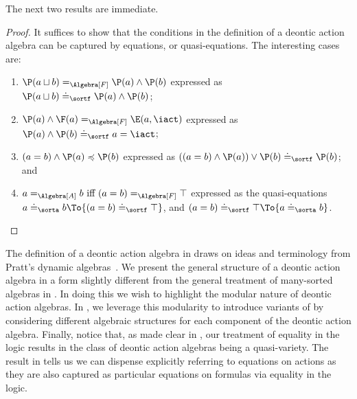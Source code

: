 \medskip

The next two results are immediate.

\medskip
{}
\medskip

\begin{proof}
	It suffices to show that the conditions in the definition of a deontic action algebra can be captured by equations, or quasi-equations.
	The interesting cases are:
	\smallskip
	\begin{enumerate}[leftmargin=\parindent]
		\item $\P(a \sqcup b) =_{\Algebra[F]} {\P(a) \land \P(b)}$ expressed as $\P(a \sqcup b) \doteq_{\sortf} \P(a) \land \P(b)$;
		\item ${\P(a) \land \F(a)} =_{\Algebra[F]} \E(a,\iact)$ expressed as ${\P(a) \land \P(b)} \doteq_{\sortf} {a = \iact}$;
		\item $(a = b) \land \P(a) \preccurlyeq \P(b)$ expressed as $((a = b) \land \P(a)) \lor \P(b) \doteq_{\sortf} \P(b)$; and
		\item ${a =_{\Algebra[A]} b} ~\text{iff}~ {(a = b) =_{\Algebra[F]} \top}$ expressed as the quasi-equations
			${a \doteq_{\sorta} b} \To {(a = b) \doteq_{\sortf} \top}$, and
			${(a = b) \doteq_{\sortf} \top} \To {a \doteq_{\sorta} b}$. \qedhere
	\end{enumerate}
\end{proof}
\medskip

The definition of a deontic action algebra in  draws on ideas and terminology from Pratt's dynamic algebras~\cite{Pratt:1991}. We present the general structure of a deontic action algebra in a form slightly different from the general treatment of many-sorted algebras in . In doing this we wish to highlight the modular nature of deontic action algebras. In , we leverage this modularity to introduce variants of \DAL by considering different algebraic structures for each component of the deontic action algebra. 
Finally, notice that, as made clear in , our treatment of equality in the logic results in the class of deontic action algebras being a quasi-variety.
The result in  tells us we can dispense explicitly referring to equations on actions as they are also captured as particular equations on formulas via equality in the logic.

